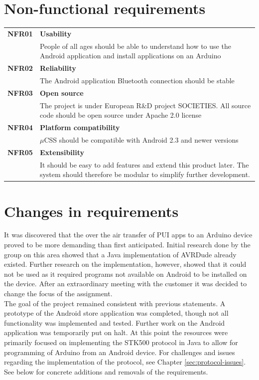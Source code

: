 \section{Non-functional requirements}
\label{non-functional}
	\begin{table}[H]
	\begin{tabularx}{\linewidth}{lX}
		\textbf{NFR01} & \textbf{Usability}\\
		 & People of all ages should be able to understand how to use the Android application and install applications on an Arduino\\
		\textbf{NFR02} & \textbf{Reliability}\\
		 & The Android application  Bluetooth connection should be stable\\
		\textbf{NFR03} & \textbf{Open source}\\
		 & The project is under European R\&D project SOCIETIES. All source code should be open source under Apache 2.0 license\\
		\textbf{NFR04} & \textbf{Platform compatibility}\\
		 & $\mu$CSS should be compatible with Android 2.3 and newer versions\\
		\textbf{NFR05} & \textbf{Extensibility}\\
		 & It should be easy to add features and extend this product later. The system should therefore be modular to simplify further development.\\
	\end{tabularx}
	\end{table}

\section{Changes in requirements}
It was discovered that the over the air transfer of PUI apps to an Arduino device proved to be more demanding than first anticipated. Initial research done by the group on this area showed that a Java implementation of AVRDude already existed. Further research on the implementation, however, showed that it could not be used as it required programs not available on Android to be installed on the device. After an extraordinary meeting with the customer it was decided to change the focus of the assignment.\\
\newline
The goal of the project remained consistent with previous statements. A prototype of the Android store application was completed, though not all functionality was implemented and tested. Further work on the Android application was temporarily put on halt. At this point the resources were primarily focused on implementing the STK500 protocol in Java to allow for programming of Arduino from an Android device. For challenges and issues regarding the implementation of the protocol, see Chapter \ref{sec:protocol-issues}. See below for concrete additions and removals of the requirements.

